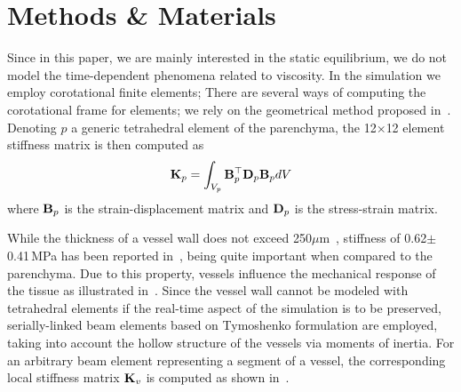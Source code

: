 \section{Methods \& Materials}
\label{sec:methodology}
\vspace{-6pt}


Since in this paper, we are mainly interested in the static equilibrium, we do not model the time-dependent
phenomena related to viscosity. In the simulation we employ corotational finite elements;
There are several ways of computing the corotational frame for elements; we rely on the geometrical method proposed in~\cite{Nesme2005}.
Denoting $p$ a generic tetrahedral element of the parenchyma, the 12$\times$12 element stiffness matrix is then computed as
\begin{equation}
\mathbf{K}_p = \int_{V_p} \mathbf{B}_p^\top \mathbf{D}_p \mathbf{B}_p dV
\end{equation}
where $\mathbf{B}_p$ is the strain-displacement matrix and $\mathbf{D}_p$ is the stress-strain matrix.

While the thickness of a vessel wall does not exceed 250$\mu$m~\cite{Forauer2003}, stiffness of 0.62$\pm$0.41\,MPa has been reported 
in~\cite{Umale2011}, being quite important when compared to the parenchyma. Due to this property, vessels influence 
the mechanical response of the tissue as illustrated in~\cite{Peterlik2012}. Since the vessel wall cannot be modeled 
with tetrahedral elements if the real-time aspect of the simulation is to be preserved, 
serially-linked beam elements based on Tymoshenko formulation are employed, taking into account the hollow 
structure of the vessels via moments of inertia. 
For an arbitrary beam element representing a segment of a vessel, the corresponding local stiffness matrix $\mathbf{K}_v$ is computed as shown in~\cite{Duriez2006}.

